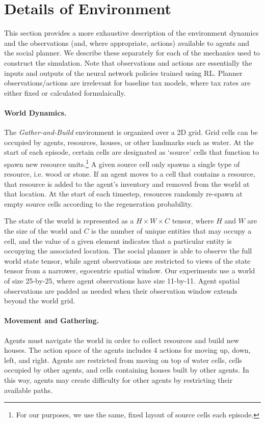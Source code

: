 \section{Details of Environment}
\label{sec:details_of_environment}

This section provides a more exhaustive description of the environment dynamics and the observations (and, where appropriate, actions) available to agents and the social planner.
We describe these separately for each of the mechanics used to construct the simulation.
Note that observations and actions are essentially the inputs and outputs of the neural network policies trained using RL.
Planner observations/actions are irrelevant for baseline tax models, where tax rates are either fixed or calculated formulaically.

\paragraph{World Dynamics.}
The \textit{Gather-and-Build} environment is organized over a 2D grid.
Grid cells can be occupied by agents, resources, houses, or other landmarks such as water.
At the start of each episode, certain cells are designated as `source' cells that function to spawn new resource units.\footnote{For our purposes, we use the same, fixed layout of source cells each episode.}
A given source cell only spawns a single type of resource, i.e. wood or stone.
If an agent moves to a cell that contains a resource, that resource is added to the agent's inventory and removed from the world at that location.
At the start of each timestep, resources randomly re-spawn at empty source cells according to the regeneration probability.

The state of the world is represented as a $H \times W \times C$ tensor, where $H$ and $W$ are the size of the world and $C$ is the number of unique entities that may occupy a cell, and the value of a given element indicates that a particular entity is occupying the associated location.
The social planner is able to observe the full world state tensor, while agent observations are restricted to views of the state tensor from a narrower, egocentric spatial window.
Our experiments use a world of size 25-by-25, where agent observations have size 11-by-11.
Agent spatial observations are padded as needed when their observation window extends beyond the world grid.


\paragraph{Movement and Gathering.}
Agents must navigate the world in order to collect resources and build new houses.
The action space of the agents includes 4 actions for moving up, down, left, and right.
Agents are restricted from moving on top of water cells, cells occupied by other agents, and cells containing houses built by other agents.
In this way, agents may create difficulty for other agents by restricting their available paths.

